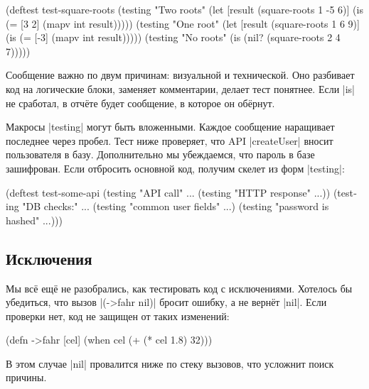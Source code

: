 \begin{english}
  \begin{clojure}
(deftest test-square-roots
  (testing "Two roots"
    (let [result (square-roots 1 -5 6)]
      (is (= [3 2] (mapv int result)))))
  (testing "One root"
    (let [result (square-roots 1 6 9)]
      (is (= [-3] (mapv int result)))))
  (testing "No roots"
    (is (nil? (square-roots 2 4 7)))))
  \end{clojure}
\end{english}

Сообщение важно по двум причинам: визуальной и технической. Оно разбивает код на
логические блоки, заменяет комментарии, делает тест понятнее. Если \spverb|is|
не сработал, в отчёте будет сообщение, в которое он обёрнут.

Макросы \spverb|testing| могут быть вложенными. Каждое сообщение наращивает
последнее через пробел. Тест ниже проверяет, что API \spverb|createUser| вносит
пользователя в базу. Дополнительно мы убеждаемся, что пароль в базе
зашифрован. Если отбросить основной код, получим скелет из форм
\spverb|testing|:

\begin{english}
  \begin{clojure}
(deftest test-some-api
  (testing "API call" ...
    (testing "HTTP response" ...))
  (testing "DB checks:" ...
    (testing "common user fields" ...)
    (testing "password is hashed" ...)))
  \end{clojure}
\end{english}

\subsection{Исключения}


Мы всё ещё не разобрались, как тестировать код с исключениями. Хотелось бы
убедиться, что вызов \spverb|(->fahr nil)| бросит ошибку, а не вернёт
\spverb|nil|. Если проверки нет, код не защищен от таких изменений:

\begin{english}
  \begin{clojure}
(defn ->fahr [cel]
  (when cel
    (+ (* cel 1.8) 32)))
  \end{clojure}
\end{english}


В этом случае \spverb|nil| провалится ниже по стеку вызовов, что усложнит поиск
причины.

